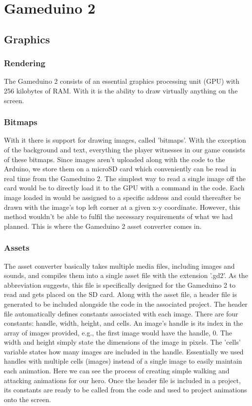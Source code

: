 \section{Gameduino 2}
\subsection{Graphics}
\subsubsection{Rendering}
The Gameduino 2 consists of an essential graphics processing unit (GPU) with 256 kilobytes of RAM. With it is the ability to draw virtually anything on the screen. 

\subsubsection{Bitmaps}
With it there is support for drawing images, called 'bitmaps'. With the exception of the background and text, everything the player witnesses in our game consists of these bitmaps. Since images aren’t uploaded along with the code to the Arduino, we store them on a microSD card which conveniently can be read in real time from the Gameduino 2. The simplest way to read a single image off the card would be to directly load it to the GPU with a command in the code. Each image loaded in would be assigned to a specific address and could thereafter be drawn with the image’s top left corner at a given x-y coordinate. However, this method wouldn’t be able to fulfil the necessary requirements of what we had planned. This is where the Gameduino 2 asset converter comes in.

\subsubsection{Assets}
The asset converter basically takes multiple media files, including images and sounds, and compiles them into a single asset file with the extension '.gd2'. As the abbreviation suggests, this file is specifically designed for the Gameduino 2 to read and gets placed on the SD card. Along with the asset file, a header file is generated to be included alongside the code in the associated project. The header file automatically defines constants associated with each image. There are four constants: handle, width, height, and cells. An image’s handle is its index in the array of images provided, e.g., the first image would have the handle, 0. The width and height simply state the dimensions of the image in pixels. The 'cells' variable states how many images are included in the handle. Essentially we used handles with multiple cells (images) instead of a single image to easily maintain each animation. Here we can see the process of creating simple walking and attacking animations for our hero. Once the header file is included in a project, its constants are ready to be called from the code and used to project animations onto the screen.


